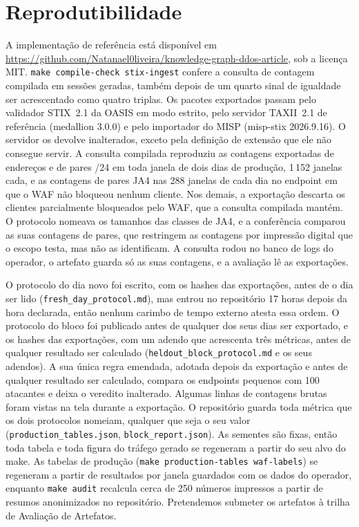\documentclass[conference,letterpaper,10pt]{IEEEtran}
\newcommand\1{\textit{(i)}}
\newcommand\2{\textit{(ii)}}
\newcommand\3{\textit{(iii)}}
\begin{document}
\section{Reprodutibilidade}
\label{app:repro}

A implementação de referência está disponível em
\url{https://github.com/Natanael0liveira/knowledge-graph-ddos-article}, sob a licença MIT. \texttt{make compile-check stix-ingest} confere a consulta de contagem compilada em sessões geradas, também depois de um quarto sinal de igualdade ser acrescentado como quatro triplas. Os pacotes exportados passam pelo validador STIX~2.1 da OASIS em modo estrito, pelo servidor TAXII~2.1 de referência (medallion 3.0.0) e pelo importador do MISP (misp-stix 2026.9.16). O servidor os devolve inalterados, exceto pela definição de extensão que ele não consegue servir. A consulta compilada reproduziu as contagens exportadas de endereços e de pares /24 em toda janela de dois dias de produção, 1\,152 janelas cada, e as contagens de pares JA4 nas 288 janelas de cada dia no endpoint em que o WAF não bloqueou nenhum cliente. Nos demais, a exportação descarta os clientes parcialmente bloqueados pelo WAF, que a consulta compilada mantém. O protocolo nomeava os tamanhos das classes de JA4, e a conferência comparou as suas contagens de pares, que restringem as contagens por impressão digital que o escopo testa, mas não as identificam. A consulta rodou no banco de logs do operador, o artefato guarda só as suas contagens, e a avaliação lê as exportações.

O protocolo do dia novo foi escrito, com os hashes das exportações, antes de o dia ser lido (\texttt{fresh\_day\_protocol.md}), mas entrou no repositório 17 horas depois da hora declarada, então nenhum carimbo de tempo externo atesta essa ordem. O protocolo do bloco foi publicado antes de qualquer dos seus dias ser exportado, e os hashes das exportações, com um adendo que acrescenta três métricas, antes de qualquer resultado ser calculado (\texttt{heldout\_block\_protocol.md} e os seus adendos). A sua única regra emendada, adotada depois da exportação e antes de qualquer resultado ser calculado, compara os endpoints pequenos com 100 atacantes e deixa o veredito inalterado. Algumas linhas de contagens brutas foram vistas na tela durante a exportação. O repositório guarda toda métrica que os dois protocolos nomeiam, qualquer que seja o seu valor (\texttt{production\_tables.json}, \texttt{block\_report.json}). As sementes são fixas, então toda tabela e toda figura do tráfego gerado se regeneram a partir do seu alvo do make. As tabelas de produção (\texttt{make production-tables waf-labels}) se regeneram a partir de resultados por janela guardados com os dados do operador, enquanto \texttt{make audit} recalcula cerca de 250 números impressos a partir de resumos anonimizados no repositório. Pretendemos submeter os artefatos à trilha de Avaliação de Artefatos.
\end{document}
